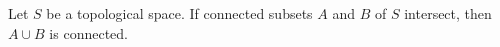 Let $S$ be a topological space. If connected subsets $A$ and $B$ of $S$ intersect, then $A \cup B$ is connected.
